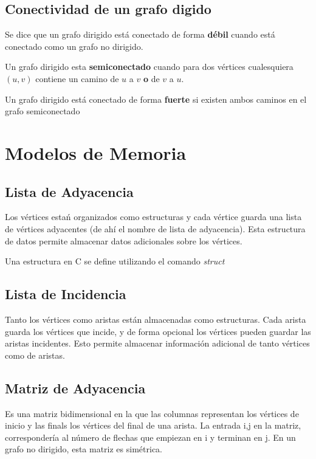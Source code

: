 \documentclass[11pt]{article}
\theoremstyle{plain}
\begin{document}

        \subsection{Conectividad de un grafo digido} %
        \label{sub:conectividad_de_un_grafo_digido}
            Se dice que un grafo dirigido está conectado de forma \textbf{débil} cuando está conectado como un grafo no dirigido.

            Un grafo dirigido esta \textbf{semiconectado} cuando para dos vértices cualesquiera $(u,v)$ contiene un camino de $u$ a $v$ \textbf{o} de $v$ a $u$.

            Un grafo dirigido está conectado de forma \textbf{fuerte} si existen ambos caminos en el grafo semiconectado
    \section{Modelos de Memoria} %
    \label{sec:modelos_de_memoria}
        \subsection{Lista de Adyacencia} %
        \label{sub:lista_de_adyacencia}
            Los vértices estań organizados como estructuras y cada vértice guarda una lista de vértices adyacentes (de ahí el nombre de lista de adyacencia). Esta estructura de datos permite almacenar datos adicionales sobre los vértices.

            Una estructura en C se define utilizando el comando \textit{struct}
        \subsection{Lista de Incidencia} %
        \label{sub:lista_de_incidencia}
            Tanto los vértices como aristas están almacenadas como estructuras. Cada arista guarda los vértices que incide, y de forma opcional los vértices pueden guardar las aristas incidentes. Esto permite almacenar información adicional de tanto vértices como de aristas.
        \subsection{Matriz de Adyacencia} %
        \label{sub:matriz_de_adyacencia}
            Es una matriz bidimensional en la que las columnas representan los vértices de inicio y las finals los vértices del final de una arista. La entrada i,j en la matriz, correspondería al número de flechas que empiezan en i y terminan en j. En un grafo no dirigido, esta matriz es simétrica.\\
\end{document}
